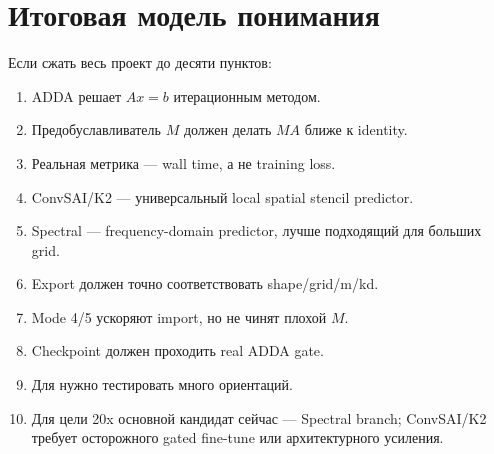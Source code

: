 \documentclass[11pt,a4paper,oneside]{book}
\newcommand{\code}[1]{\texttt{\detokenize{#1}}}
\begin{document}
\backmatter

\chapter{Итоговая модель понимания}

Если сжать весь проект до десяти пунктов:

\begin{enumerate}[leftmargin=2em]
  \item ADDA решает $Ax=b$ итерационным методом.
  \item Предобуславливатель $M$ должен делать $MA$ ближе к identity.
  \item Реальная метрика --- wall time, а не training loss.
  \item ConvSAI/K2 --- универсальный local spatial stencil predictor.
  \item Spectral --- frequency-domain predictor, лучше подходящий для больших grid.
  \item Export должен точно соответствовать shape/grid/m/kd.
  \item Mode 4/5 ускоряют import, но не чинят плохой $M$.
  \item Checkpoint должен проходить real ADDA gate.
  \item Для \code{-orient avg} нужно тестировать много ориентаций.
  \item Для цели 20x основной кандидат сейчас --- Spectral branch; ConvSAI/K2
  требует осторожного gated fine-tune или архитектурного усиления.
\end{enumerate}
\end{document}
